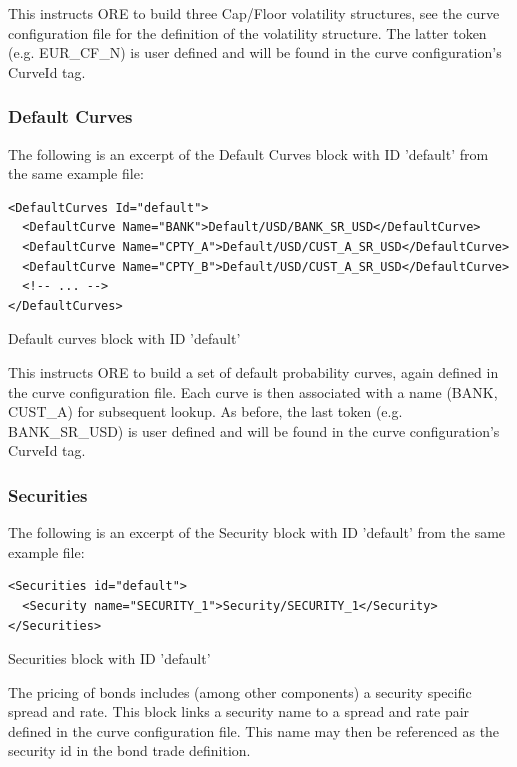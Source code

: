 \documentclass[12pt, a4paper]{article}
\begin{document}
{This instructs ORE to build three Cap/Floor volatility structures, see the curve configuration file for the definition
of the volatility structure. The latter token (e.g. EUR\_CF\_N) is user defined and will be found in the curve
configuration's CurveId tag.

\subsubsection{Default Curves}

The following is an excerpt of the Default Curves block with ID 'default' from the same example file:

\begin{listing}[H]
\begin{verbatim}
<DefaultCurves Id="default">
  <DefaultCurve Name="BANK">Default/USD/BANK_SR_USD</DefaultCurve>
  <DefaultCurve Name="CPTY_A">Default/USD/CUST_A_SR_USD</DefaultCurve>
  <DefaultCurve Name="CPTY_B">Default/USD/CUST_A_SR_USD</DefaultCurve>
  <!-- ... -->
</DefaultCurves>
\end{verbatim}
\caption{Default curves block with ID 'default'}
\label{lst:defaultcurve_spec}
\end{listing}

This instructs ORE to build a set of default probability curves, again defined in the curve configuration file. Each
curve is then associated with a name (BANK, CUST\_A) for subsequent lookup.  As before, the last token
(e.g. BANK\_SR\_USD) is user defined and will be found in the curve configuration's CurveId tag.

\subsubsection{Securities}\label{sssec:securities}

The following is an excerpt of the Security block with ID 'default' from the same example file:

\begin{listing}[H]
	\begin{verbatim}
<Securities id="default">
  <Security name="SECURITY_1">Security/SECURITY_1</Security>
</Securities>
	\end{verbatim}
	\caption{Securities block with ID 'default'}
	\label{lst:secspread_spec}
\end{listing}

The pricing of bonds includes (among other components) a security specific spread and rate. 
This block links a security name to a spread and rate pair defined in the curve configuration file. This name may then be referenced 
as the security id in the bond trade definition.

}
\end{document}
